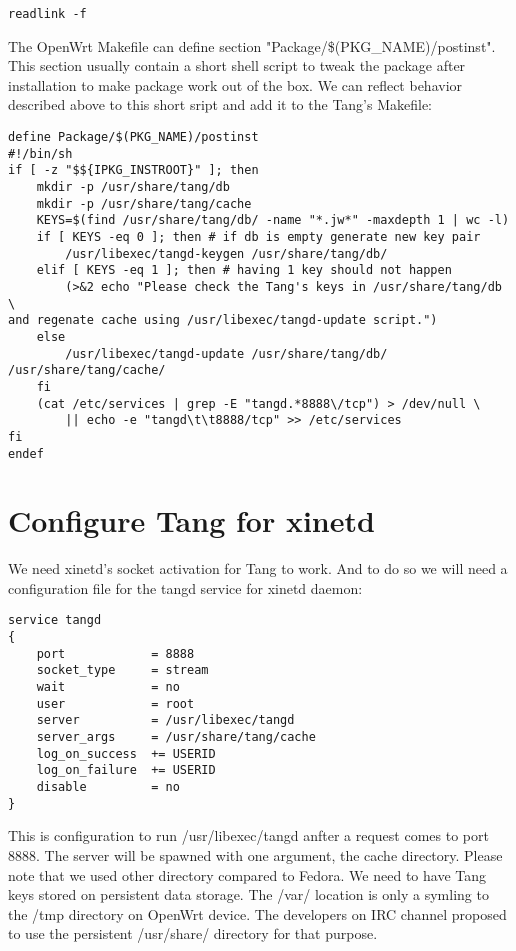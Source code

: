 \begin{lstlisting}[columns=fixed,basicstyle=\ttfamily\footnotesize,tabsize=4,backgroundcolor=\color{yellow!10}]
readlink -f
\end{lstlisting}

The OpenWrt Makefile can define section "Package/\$(PKG\_NAME)/postinst".
This section usually contain a short shell script to tweak the package after installation to make package work out of the box.
We can reflect behavior described above to this short sript and add it to the Tang's Makefile:
\begin{lstlisting}[columns=fixed,basicstyle=\ttfamily\footnotesize,tabsize=4,backgroundcolor=\color{yellow!10}]
define Package/$(PKG_NAME)/postinst
#!/bin/sh
if [ -z "$${IPKG_INSTROOT}" ]; then
	mkdir -p /usr/share/tang/db
	mkdir -p /usr/share/tang/cache
	KEYS=$(find /usr/share/tang/db/ -name "*.jw*" -maxdepth 1 | wc -l)
	if [ KEYS -eq 0 ]; then # if db is empty generate new key pair
		/usr/libexec/tangd-keygen /usr/share/tang/db/
	elif [ KEYS -eq 1 ]; then # having 1 key should not happen
		(>&2 echo "Please check the Tang's keys in /usr/share/tang/db \
and regenate cache using /usr/libexec/tangd-update script.")
	else
		/usr/libexec/tangd-update /usr/share/tang/db/ /usr/share/tang/cache/
	fi
	(cat /etc/services | grep -E "tangd.*8888\/tcp") > /dev/null \
		|| echo -e "tangd\t\t8888/tcp" >> /etc/services
fi
endef
\end{lstlisting}



\section{Configure Tang for xinetd}

We need xinetd's socket activation for Tang to work.
And to do so we will need a configuration file for the tangd service for xinetd daemon:
\begin{lstlisting}[columns=fixed,basicstyle=\ttfamily\footnotesize,tabsize=4,backgroundcolor=\color{yellow!10},caption=Configuration of Tang service for xinetd]
service tangd
{
    port            = 8888
    socket_type     = stream
    wait            = no
    user            = root
    server          = /usr/libexec/tangd
    server_args     = /usr/share/tang/cache
    log_on_success  += USERID
    log_on_failure  += USERID
    disable         = no
}
\end{lstlisting}
This is configuration to run /usr/libexec/tangd anfter a request comes to port 8888.
The server will be spawned with one argument, the cache directory.
Please note that we used other directory compared to Fedora.
We need to have Tang keys stored on persistent data storage.
The /var/ location is only a symling to the /tmp directory on OpenWrt device.
The developers on IRC channel proposed to use the persistent /usr/share/ directory for that purpose.

